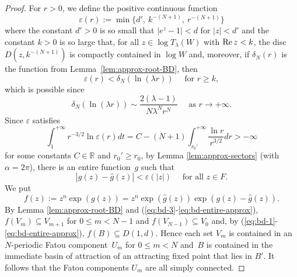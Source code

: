 \documentclass[a4paper, 12pt, reqno]{amsart}
\numberwithin{equation}{section}
\theoremstyle{plain}
\theoremstyle{definition}
\theoremstyle{remark}
\newcommand{\R}{{\mathbb{R}}}
\begin{document}
\begin{proof}
For $r>0$, we define the positive continuous function 
\begin{equation}
\varepsilon(r):=\min\{d',\ k^{-(N+1)},\ r^{-(N+1)}\} 
\label{eq:bd-4}
\end{equation}
where the constant $d'>0$ is so small that $|e^z-1|<d$ for $|z|<d'$ and the constant $k>0$ is so large that, for all $z\in \log T_\lambda(W)$ with $\textup{Re}\,z<k$, the disc $D(z,k^{-(N+1)})$ is compactly contained in $\log W$ and, moreover, if $\delta_{N}(r)$ is the function from Lemma~\ref{lem:approx-root-BD}, then
\begin{equation}
\varepsilon(r)<\delta_{N}(\ln (\lambda r)) \quad \mbox{ for } r\geqslant k,
\label{eq:bd-5}
\end{equation}
which is possible since
$$
\delta_{N}(\ln (\lambda r))\sim \frac{2(\lambda-1)}{N\lambda^N r^N} \quad \mbox{ as } r\to+\infty.
$$
Since $\varepsilon$ satisfies
$$
\int_1^{+\infty} r^{-3/2}\ln\varepsilon(r)dt=C-(N+1)\int_{r_0'}^{+\infty} \frac{\ln r}{r^{3/2}}dr>-\infty
$$
for some constants $C\in\R$ and $r_0'\geqslant r_0$, by Lemma \ref{lem:approx-sectors} (with $\alpha=2\pi$), there is an entire function~$g$ such that
\begin{equation}
|g(z)-\hat{g}(z)|<\varepsilon(|z|)\quad\mbox{ for all } z\in F.
\label{eq:bd-entire-approx}
\end{equation}
We put 
\begin{equation}
f(z):=z^n\exp(g(z))=z^n\exp(\hat{g}(z))\exp(g(z)-\hat{g}(z)).
\label{eq:bd-6}
\end{equation}
By Lemma \ref{lem:approx-root-BD} and (\ref{eq:bd-3}-\ref{eq:bd-entire-approx}), $f(V_m)\subseteq V_{m+1}$ for \mbox{$0\leqslant m<N- 1$} and $f(V_{N-1})\subseteq V_0$ and, by (\ref{eq:bd-1}-\ref{eq:bd-entire-approx}), $f(B)\subseteq D(1,d)$. Hence each set $V_m$ is contained in an $N$-periodic Fatou component~$U_m$ for $0\leqslant m<N$ and~$B$ is contained in the immediate basin of attraction of an attracting fixed point that lies in $B'$. It follows that the Fatou components $U_m$ are all simply connected.


\end{proof}
\end{document}
